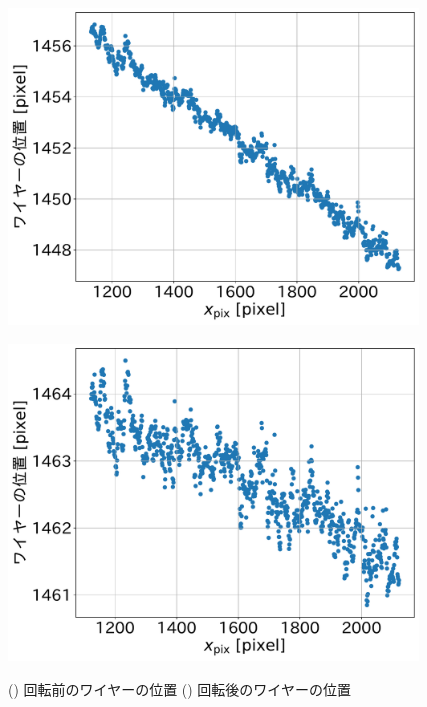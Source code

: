 \documentclass[../../main.tex]{subfiles}
\begin{document}
\begin{figure}[H]
    \begin{minipage}[b]{0.5\hsize}
        \centering
        \includegraphics[width=0.97\textwidth]{wiresag/wiresag_wire_positions.pdf}
        \subcaption{}
        \label{fig:wiresag_wire_positions_line}
    \end{minipage}
    \begin{minipage}[b]{0.5\hsize}
        \centering
        \includegraphics[width=0.97\textwidth]{wiresag/wiresag_wire_positions_rot.pdf}
        \subcaption{}
        \label{fig:wiresag_wire_positions_rot}
    \end{minipage}
    \caption{() 回転前のワイヤーの位置
             () 回転後のワイヤーの位置
             }
    \label{fig:wiresag_wire_positions}
\end{figure}
\end{document}
